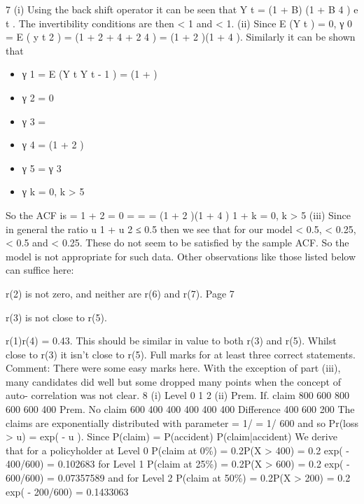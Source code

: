 \documentclass[a4paper,12pt]{article}
\begin{document}
7
(i)
Using the back shift operator it can be seen that
Y t = (1 +  B) (1 +  B 4 ) e t .
The invertibility conditions are then  < 1 and  < 1.
(ii)
Since E (Y t ) = 0, γ 0 = E ( y t 2 ) =  (1 +  2 +  4 +  2  4 ) =  (1 +  2 )(1 +  4 ).
Similarly it can be shown that
\begin{itemize}
\item γ 1 = E (Y t Y t - 1 ) =   (1 +  )
\item γ 2 = 0
\item γ 3 =   
\item γ 4 =   (1 +  2 )
\item γ 5 = γ 3
\item γ k = 0, k > 5
\end{itemize}
So the ACF is
 =
1 +  2
 = 0
 =  =
 =
 
(1 +  2 )(1 +  4 )
1 + 
\rho k = 0, k > 5
(iii)
Since in general the ratio
u
1 + u 2
≤ 0.5 then we see that for our model
 < 0.5,  < 0.25,  < 0.5 and  < 0.25. These do not seem to be
satisfied by the sample ACF. So the model is not appropriate for such data.
Other observations like those listed below can suffice here:
\item 
r(2) is not zero, and neither are r(6) and r(7).
Page 7%
\item  r(3) is not close to r(5).
\item  r(1)r(4) = 0.43. This should be similar in value to both r(3) and r(5).
Whilst close to r(3) it isn't close to r(5).
Full marks for at least three correct statements.
Comment: There were some easy marks here. With the exception of part (iii), many
candidates did well but some dropped many points when the concept of auto-
correlation was not clear.
8
(i)
Level
0
1
2
(ii)
Prem. If. claim
800 600
800 600
600 400
Prem. No claim
600 400
400 400
400 400
Difference
400
600
200
The claims are exponentially distributed with parameter \lambda = 1/ \mu = 1/ 600 and
so Pr(loss > u) = exp( - u \lambda).
Since
P(claim) = P(accident) P(claim|accident)
We derive that for a policyholder at Level 0
P(claim at 0\%) = 0.2P(X > 400) = 0.2 exp( - 400/600) = 0.102683
for Level 1
P(claim at 25\%) = 0.2P(X > 600) = 0.2 exp( - 600/600) = 0.07357589
and for Level 2
P(claim at 50\%) = 0.2P(X > 200) = 0.2 exp( - 200/600) = 0.1433063
\end{document}
